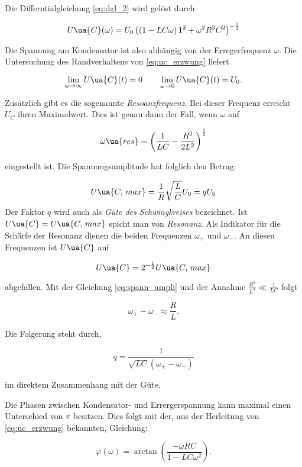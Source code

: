 Die Differntialgleichung \eqref{eq:dgl_2} wird gelöst durch

\begin{equation}
  \label{eq:uc_erzwung}
  U\ua{C}(\omega)=U_0\left(\left(1-LC\omega\right)1^2+\omega^2R^2C^2\right)^{-\frac{1}{2}}
\end{equation}

Die Spannung am Kondensator ist also abhängig von der Erregerfrequenz $\omega$.
Die Untersuchung des Randverhaltens von \eqref{eq:uc_erzwung} liefert

\begin{equation*}
  \lim_{\omega \to \infty} U\ua{C}(t)=0 \qquad \lim_{\omega \to 0} U\ua{C}(t)=U_0.
\end{equation*}

Zusätzlich gibt es die sogenannte \emph{Resoanzfrequenz}.
Bei dieser Frequenz erreicht $U_C$ ihren Maximalwert. Dies ist genau dann der Fall, wenn
$\omega$ auf

\begin{equation*}
  \label{eq:resonanzfrequenz}
  \omega\ua{res}=\left(\frac{1}{LC}-\frac{R^2}{2L^2}\right)^{\frac{1}{2}}
\end{equation*}

eingestellt ist.
Die Spannungsamplitude hat folglich den Betrag:

\begin{equation}
  \label{eq:spann_ampli}
  U\ua{C,\, max}=\frac{1}{R}\sqrt{\frac{L}{C}}U_0=qU_0
\end{equation}
Der Faktor $q$ wird auch als \emph{Güte des Schwingkreises} bezeichnet.
Ist $U\ua{C}=U\ua{C,\, max}$ spicht man von \emph{Resonanz}.
Als Indikator für die Schärfe der Resonanz dienen die beiden
Frequenzen $\omega_+$ und $\omega_-$. An diesen Frequenzen ist
$U\ua{C}$ auf

\begin{equation*}
   U\ua{C}=2^{-\frac{1}{2}} U\ua{C,\, max}
\end{equation*}

abgefallen.
Mit der Gleichung \eqref{eq:spann_ampli} und der Annahme $\frac{R^2}{L^2}\ll \frac{1}{LC}$
folgt

\begin{equation}
  \label{eq:omega_+_-}
  \omega_+-\omega_-\approx \frac{R}{L}.
\end{equation}

Die Folgerung steht durch,

\begin{equation*}
  q=\frac{1}{\sqrt{LC}\left(\omega_+-\omega_-\right)}
\end{equation*}

im direktem Zusammenhang mit der Güte.

Die Phasen zwischen Kondensator- und Errergerspannung kann maximal
einen Unterschied von $\pi$ besitzen. Dies folgt mit der, aus der
Herleitung von \eqref{eq:uc_erzwung} bekannten, Gleichung:

\begin{equation}
  \label{eq:phase}
  \varphi(\omega)=\arctan\left(\frac{-\omega RC}{1-LC\omega^2}\right).
\end{equation}
